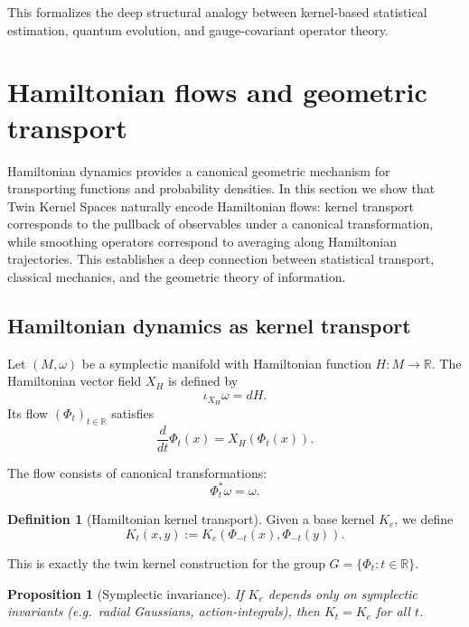 \documentclass[11pt]{article}
\newtheorem{proposition}[theorem]{Proposition}
\theoremstyle{definition}
\newtheorem{definition}[theorem]{Definition}
\begin{document}
This formalizes the deep structural analogy between kernel-based statistical estimation, quantum evolution, and gauge-covariant operator theory.


	
\section{Hamiltonian flows and geometric transport}
\label{sec:hamiltonian}

Hamiltonian dynamics provides a canonical geometric mechanism for transporting functions and probability densities.
In this section we show that Twin Kernel Spaces naturally encode Hamiltonian flows: kernel transport corresponds to the pullback of observables under a canonical transformation, while smoothing operators correspond to averaging along Hamiltonian trajectories.
This establishes a deep connection between statistical transport, classical mechanics, and the geometric theory of information.

\subsection{Hamiltonian dynamics as kernel transport}

Let $(M,\omega)$ be a symplectic manifold with Hamiltonian function $H:M\to\mathbb{R}$.
The Hamiltonian vector field $X_H$ is defined by
\[
\iota_{X_H}\omega = dH.
\]
Its flow $(\Phi_t)_{t\in\mathbb{R}}$ satisfies
\[
\frac{d}{dt}\Phi_t(x) = X_H(\Phi_t(x)).
\]

The flow consists of canonical transformations:
\[
\Phi_t^\ast\omega = \omega.
\]

\begin{definition}[Hamiltonian kernel transport]
	Given a base kernel $K_e$, we define
	\[
	K_t(x,y):=K_e(\Phi_{-t}(x),\Phi_{-t}(y)).
	\]
\end{definition}

This is exactly the twin kernel construction for the group $G=\{\Phi_t: t\in\mathbb{R}\}$.

\begin{proposition}[Symplectic invariance]
	If $K_e$ depends only on symplectic invariants (e.g.\ radial Gaussians, action-integrals), then $K_t=K_e$ for all $t$.
\end{proposition}
\end{document}

